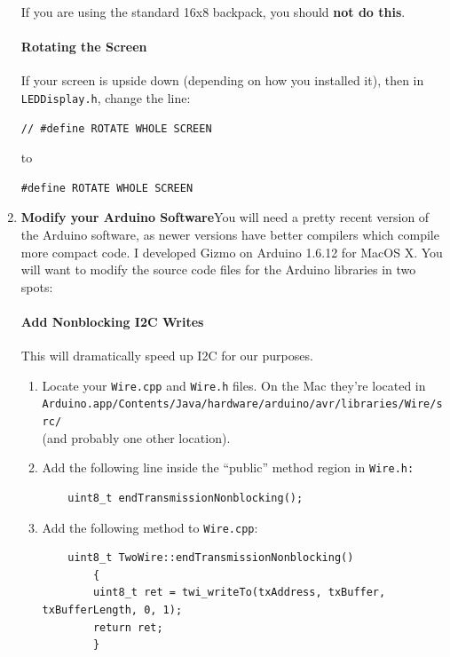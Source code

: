 \documentclass{article}
\begin{document}
\begin{enumerate}
If you are using the standard 16x8 backpack, you should {\bf not do this}.

\paragraph{Rotating the Screen} If your screen is upside down (depending on how you installed it), then in \texttt{LEDDisplay.h}, change the line:

\begin{verbatim}
// #define ROTATE WHOLE SCREEN
\end{verbatim}

to

\begin{verbatim}
#define ROTATE WHOLE SCREEN
\end{verbatim}


\item {\bf Modify your Arduino Software}\quad You will need a pretty recent version of the Arduino software, as newer versions have better compilers which compile more compact code.  I developed Gizmo on Arduino 1.6.12 for MacOS X.  You will want to modify the source code files for the Arduino libraries in two spots:

\paragraph{Add Nonblocking I2C Writes}  This will dramatically speed up I2C for our purposes.
\begin{enumerate}
\item Locate your \texttt{Wire.cpp} and \texttt{Wire.h} files.  On the Mac they're located in\\\texttt{Arduino.app/Contents/Java/hardware/arduino/avr/libraries/Wire/src/}\\(and probably one other location).

\item Add the following line inside the ``public'' method region in \texttt{Wire.h:}

\begin{verbatim}
    uint8_t endTransmissionNonblocking();
\end{verbatim}

\item Add the following method to \texttt{Wire.cpp}:

\begin{verbatim}
    uint8_t TwoWire::endTransmissionNonblocking()
        {
        uint8_t ret = twi_writeTo(txAddress, txBuffer, txBufferLength, 0, 1);
        return ret;
        }
\end{verbatim}
\end{enumerate}


\end{enumerate}
\end{document}
